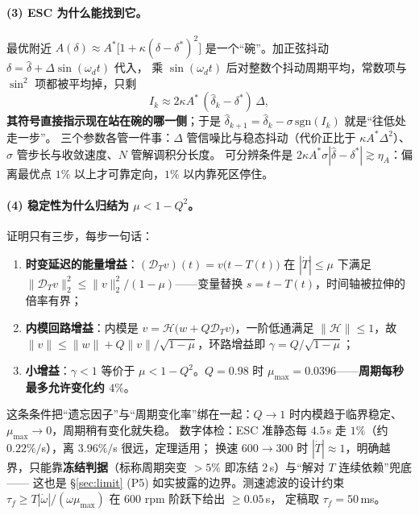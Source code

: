 \documentclass[11pt,a4paper]{article}
\theoremstyle{remark}\newtheorem{remark}{注}
\begin{document}
\paragraph{(3) ESC 为什么能找到它。}
最优附近 $A(\delta)\approx A^{*}\bigl[1+\kappa(\delta-\delta^{*})^{2}\bigr]$ 是一个“碗”。加正弦抖动 $\delta=\hat\delta+\Delta\sin(\omega_d t)$ 代入，
乘 $\sin(\omega_d t)$ 后对整数个抖动周期平均，常数项与 $\sin^{2}$ 项都被平均掉，只剩
\begin{equation}
I_k\approx2\kappa A^{*}\,(\hat\delta_k-\delta^{*})\,\Delta ,
\label{eq:intuition-I}
\end{equation}
\textbf{其符号直接指示现在站在碗的哪一侧}；于是 $\hat\delta_{k+1}=\hat\delta_k-\sigma\,\mathrm{sgn}(I_k)$ 就是“往低处走一步”。
三个参数各管一件事：$\Delta$ 管信噪比与稳态抖动（代价正比于 $\kappa A^{*}\Delta^{2}$）、$\sigma$ 管步长与收敛速度、$N$ 管解调积分长度。
可分辨条件是 $2\kappa A^{*}\sigma|\hat\delta-\delta^{*}|\gtrsim\eta_A$：偏离最优点 $1\%$ 以上才可靠定向，$1\%$ 以内靠死区停住。

\paragraph{(4) 稳定性为什么归结为 $\mu<1-Q^{2}$。}
证明只有三步，每步一句话：
\begin{enumerate}
  \item \textbf{时变延迟的能量增益}：$(\mathcal D_T v)(t)=v\bigl(t-T(t)\bigr)$ 在 $|\dot T|\le\mu$ 下满足
        $\|\mathcal D_T v\|_2^{2}\le\|v\|_2^{2}/(1-\mu)$——变量替换 $s=t-T(t)$，时间轴被拉伸的倍率有界；
  \item \textbf{内模回路增益}：内模是 $v=\mathcal H\bigl(w+Q\mathcal D_T v\bigr)$，一阶低通满足 $\|\mathcal H\|\le1$，故
        $\|v\|\le\|w\|+Q\|v\|/\sqrt{1-\mu}$，环路增益即 $\gamma=Q/\sqrt{1-\mu}$；
  \item \textbf{小增益}：$\gamma<1$ 等价于 $\mu<1-Q^{2}$。$Q=0.98$ 时 $\mu_{\max}=0.0396$——\textbf{周期每秒最多允许变化约 $4\%$}。
\end{enumerate}
这条条件把“遗忘因子”与“周期变化率”绑在一起：$Q\to1$ 时内模趋于临界稳定、$\mu_{\max}\to0$，周期稍有变化就失稳。
数字体检：ESC 准静态每 $4.5$\,s 走 $1\%$（约 $0.22\%/$s），离 $3.96\%/$s 很远，定理适用；
换速 $600\to300$ 时 $|\dot T|\approx1$，明确越界，只能靠\textbf{冻结判据}（标称周期突变 $>5\%$ 即冻结 $2$\,s）与“解对 $T$ 连续依赖”兜底——
这也是 §\ref{sec:limit} (P5) 如实披露的边界。测速滤波的设计约束 $\tau_f\ge T|\dot\omega|/(\omega\mu_{\max})$ 在 600 rpm 阶跃下给出 $\ge0.05$\,s，
定稿取 $\tau_f=50$\,ms。
\end{document}
